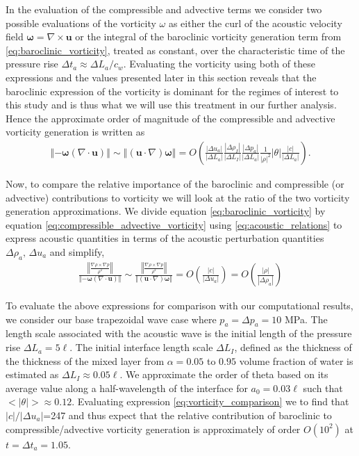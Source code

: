 \documentclass{jfm}%
\newcommand{\orderof}[1]{\ensuremath{\textit{O}\left(#1\right)}}
\newcommand{\abs}[1]{\ensuremath{\left|#1\right|}}
\newcommand{\norm}[1]{\ensuremath{\left\Vert#1\right\Vert}}
\begin{document}
In the evaluation of the compressible and advective terms we consider
two possible evaluations of the vorticity $\omega$ as either the curl
of the acoustic velocity field
$\boldsymbol{\omega}=\nabla\times\boldsymbol{u}$ or the integral of
the baroclinic vorticity generation term from
\eqref{eq:baroclinic_vorticity}, treated as constant, over the
characteristic time of the pressure rise
$\Delta t_a\approx\Delta L_a/c_w$. Evaluating the vorticity using both
of these expressions and the values presented later in this section
reveals that the baroclinic expression of the vorticity is dominant
for the regimes of interest to this study and is thus what we will use
this treatment in our further analysis. Hence the approximate order of magnitude of the compressible and
advective vorticity generation is written as
\begin{align}
  \label{eq:compressible_advective_vorticity}%
  \norm{-\boldsymbol{\omega}\left(\nabla\cdot\boldsymbol{u}\right)}\sim \norm{\left(\boldsymbol{u}\cdot\nabla\right)\boldsymbol{\omega}} = %
  \orderof{%
  \frac{\abs{\Delta u_a}}{\abs{\Delta L_a}} \frac{\abs{\Delta \rho_I}}{\abs{\Delta L_I}}%
  \frac{\abs{\Delta p_a}}{\abs{\Delta L_a}} \frac{1}{\abs{\rho}^2}\abs{\theta}\frac{\abs{c}}{\abs{\Delta L_a}}%
  }.%
\end{align}

Now, to compare the relative importance of the baroclinic and
compressible (or advective) contributions to vorticity we will look at
the ratio of the two vorticity generation approximations. We divide
equation \eqref{eq:baroclinic_vorticity} by equation
\eqref{eq:compressible_advective_vorticity} using
\eqref{eq:acoustic_relations} to express acoustic quantities in terms
of the acoustic perturbation quantities $\Delta \rho_a,\,\Delta u_a$ and simplify,
\begin{align} \label{eq:vorticity_comparison}
  \frac{\norm{\frac{\nabla\rho\times\nabla
  p}{\rho^2}}}{\norm{-\boldsymbol{\omega}\left(\nabla\cdot\boldsymbol{u}\right)}}
  \sim
  \frac{\norm{\frac{\nabla\rho\times\nabla
  p}{\rho^2}}}{\norm{\left(\boldsymbol{u}\cdot\nabla\right)\boldsymbol{\omega}}}
  = \orderof{\frac{\abs{c}}{\abs{\Delta u_a}}} = \orderof{\frac{\abs{\rho}}{\abs{\Delta \rho_a}}}%
\end{align}

To evaluate the above expressions for comparison with our
computational results, we consider our base trapezoidal wave case
where $p_a = \Delta p_a = 10$ MPa. The length scale associated with
the acoustic wave is the initial length of the pressure rise
$\Delta L_a=5\ell$. The initial interface length scale
$\Delta L_I$, defined as the thickness of the thickness of the mixed
layer from $\alpha=0.05$ to $0.95$ volume fraction of water is estimated
as $\Delta L_I \approx 0.05\ell$. We approximate the order of theta
based on its average value along a half-wavelength of the interface
for $a_0=0.03\ell$ such that
$<\abs{\theta}>\approx0.12$. Evaluating expression
\eqref{eq:vorticity_comparison} we to find that
$\abs{c}/\abs{\Delta u_a}$=247 and thus expect that the relative
contribution of baroclinic to compressible/advective vorticity
generation is approximately of order $\orderof{10^2}$ at
$t=\Delta t_a=1.05$.
\end{document}
